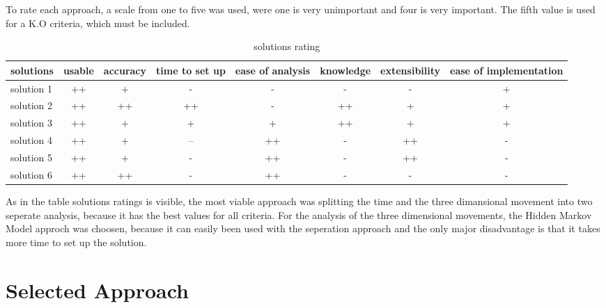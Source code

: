 To rate each approach, a scale from one to five was used, were one is very unimportant and four is very important. The fifth value is used for a K.O criteria, which must be included.

\begin{table}[h]
\begin{tabular}{|l|c|c|c|c|c|c|c|}
\hline
\textbf{solutions} & usable & accuracy & time to set up & ease of analysis & knowledge & extensibility & ease of implementation \\
\hline
solution 1 &\cellcolor[HTML]{38761d}++&\cellcolor[HTML]{93c47d}+&\cellcolor[HTML]{dd7e6b}-&\cellcolor[HTML]{dd7e6b}-&\cellcolor[HTML]{dd7e6b}-&\cellcolor[HTML]{dd7e6b}-&\cellcolor[HTML]{93c47d}+ \\
\hline
solution 2 &\cellcolor[HTML]{38761d}++&\cellcolor[HTML]{38761d}++&\cellcolor[HTML]{38761d}++&\cellcolor[HTML]{dd7e6b}-&\cellcolor[HTML]{38761d}++&\cellcolor[HTML]{93c47d}+&\cellcolor[HTML]{93c47d}+\\
\hline
solution 3 &\cellcolor[HTML]{38761d}++&\cellcolor[HTML]{93c47d}+&\cellcolor[HTML]{93c47d}+&\cellcolor[HTML]{93c47d}+&\cellcolor[HTML]{38761d}++&\cellcolor[HTML]{93c47d}+&\cellcolor[HTML]{93c47d}+\\
\hline
solution 4 &\cellcolor[HTML]{38761d}++&\cellcolor[HTML]{93c47d}+&\cellcolor[HTML]{cc4125}--&\cellcolor[HTML]{38761d}++&\cellcolor[HTML]{dd7e6b}-&\cellcolor[HTML]{38761d}++&\cellcolor[HTML]{dd7e6b}-\\
\hline
solution 5 &\cellcolor[HTML]{38761d}++&\cellcolor[HTML]{93c47d}+&\cellcolor[HTML]{dd7e6b}-&\cellcolor[HTML]{38761d}++&\cellcolor[HTML]{dd7e6b}-&\cellcolor[HTML]{38761d}++&\cellcolor[HTML]{dd7e6b}- \\
\hline
solution 6 &\cellcolor[HTML]{38761d}++&\cellcolor[HTML]{38761d}++&\cellcolor[HTML]{dd7e6b}-&\cellcolor[HTML]{38761d}++&\cellcolor[HTML]{dd7e6b}-&\cellcolor[HTML]{dd7e6b}-&\cellcolor[HTML]{dd7e6b}-\\
\hline
\end{tabular}
\caption{ solutions rating }
\end{table}

As in the table solutions ratings is visible, the most viable approach was splitting the time and the three dimansional movement into two seperate analysis, because it has the best values for all criteria. For the analysis of the three dimensional movements, the Hidden Markov Model approch was choosen, because it can easily been used with the seperation approach and the only major disadvantage is that it takes more time to set up the solution. 

\section{Selected Approach}




